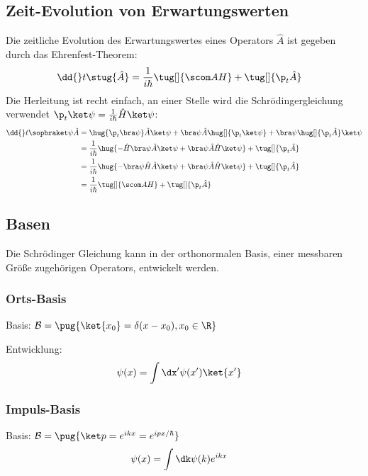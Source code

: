 \documentclass[twocolumn, unnumberedsubsub]{summery_3.1}
\begin{document}
\subsection{Zeit-Evolution von Erwartungswerten}
Die zeitliche Evolution des Erwartungswertes eines Operators \(\hat A\)
ist gegeben durch das Ehrenfest-Theorem:
\begin{align*}
    \dd{}t \stug {\hat A} &= \frac 1{i\hbar} \tug[]{\scom AH} + \tug[]{\p_t \hat A}
\end{align*}
Die Herleitung ist recht einfach, an einer Stelle wird die Schrödingergleichung verwendet \(\p_t \ket\psi = \frac1{i\hbar}\hat H \ket\psi\):
\begin{align*}
    \dd{}t \sopbraket \psi{\hat A} 
    &= \hug{\p_t \bra\psi}\hat A \ket \psi
    + \bra\psi\hat A \hug[]{\p_t\ket \psi}
    + \bra\psi \hug[]{\p_t \hat A} \ket \psi\\
    &= \frac{1}{i\hbar}\hug{
        -\hat H\bra\psi\hat A\ket\psi+ 
        \bra\psi\hat A \hat H \ket \psi}
    + \tug[]{\p_t \hat A}\\
    &= \frac{1}{i\hbar}\hug{- \bra\psi\hat H\hat A\ket\psi + \bra\psi\hat A \hat H \ket \psi} + \tug[]{\p_t \hat A}\\
    &= \frac{1}{i\hbar}\tug[]{\scom AH} + \tug[]{\p_t \hat A}
\end{align*}

\subsection{Basen}
Die Schrödinger Gleichung kann in der orthonormalen Basis, einer messbaren Größe zugehörigen Operators,
entwickelt werden.
\subsubsection{Orts-Basis}
Basis: \(\mathcal B = \pug{\ket{x_0} = \delta(x-x_0), x_0\in\R}\)

Entwicklung: 
\begin{align*}
    \psi(x) &= \int\dx' \psi(x') \ket{x'}
\end{align*}

\subsubsection{Impuls-Basis}
Basis: \(\mathcal B = \pug{\ket p = e^{ikx}= e^{i p x/\hbar}}\)
\begin{align*}
    \psi(x) &= \int \dk \psi(k) e^{ikx}
\end{align*}
\end{document}
